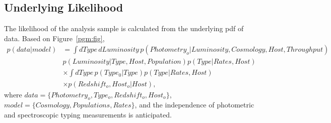 \documentclass[preprint,3p]{elsarticle}
\begin{document}
\subsection{Underlying Likelihood}
The likelihood of the analysis sample is calculated from the underlying pdf of data.  Based on Figure~\ref{pgm:fig},
\begin{align}
p(data|model) &=\int dType\, dLuminosity\, p(Photometry_o |  Luminosity, Cosmology,Host,Throughput)  \nonumber\\
& p(Luminosity| Type
, Host, Population) p(Type | Rates, Host)  \nonumber\\
& \times \int dType\, p(Type_0|Type) p(Type|Rates, Host) \nonumber \\
& \times p(Redshift_o, Host_o| Host),
\label{like:eqn}
\end{align}
where $data=\{Photometry_o, Type_o, Redshift_o, Host_o\}$,
$model=\{Cosmology, Populations, Rates\}$, and the independence
of photometric and spectroscopic typing measurements is anticipated.
\end{document}
